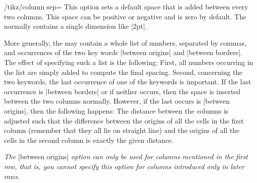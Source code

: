 \begin{key}{/tikz/column sep=}
  This option sets a default space that is added between every two
  columns. This space can be positive or negative and is zero by
  default. The  normally contains a single
  dimension like |2pt|.
\begin{codeexample}[]
\end{codeexample}
  More generally, the  may contain a whole list of
  numbers, separated by commas, and occurrences of the two key words
  |between origins| and |between borders|. The effect of specifying
  such a list is the following: First, all numbers occurring in the
  list are simply added to compute the final spacing. Second,
  concerning the two keywords, the last occurrence of one of the keywords is
  important. If the last occurrence is |between borders| or if neither
  occurs, then the space is inserted between the two columns
  normally. However, if the last occurs is |between origins|, then the
  following happens: The distance between the columns is adjusted such
  that the difference between the origins of all the cells in the
  first column (remember that they all lie on straight line) and the
  origins of all the cells in the second column is exactly the given
  distance.

  \emph{The }|between origins|\emph{ option can only be used for columns
    mentioned in the first row, that is, you cannot specify this
    option for columns introduced only in later rows.}

\begin{codeexample}[]
\end{codeexample}
\end{key}

